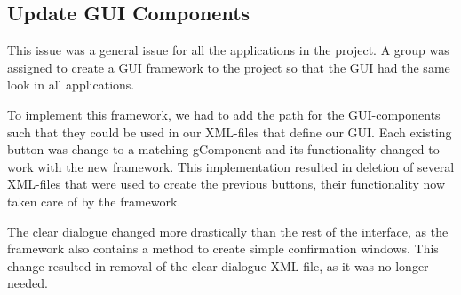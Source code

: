 \subsection{Update GUI Components}
This issue was a general issue for all the applications in the project. 
A group was assigned to create a GUI framework to the project so that the GUI had the same look in all applications.

To implement this framework, we had to add the path for the GUI-components such that they could be used in our XML-files that define our GUI.
Each existing button was change to a matching gComponent and its functionality changed to work with the new framework.
This implementation resulted in deletion of several XML-files that were used to create the previous buttons, their functionality now taken care of by the framework.

The clear dialogue changed more drastically than the rest of the interface, as the framework also contains a method to create simple confirmation windows. This change resulted in removal of the clear dialogue XML-file, as it was no longer needed.